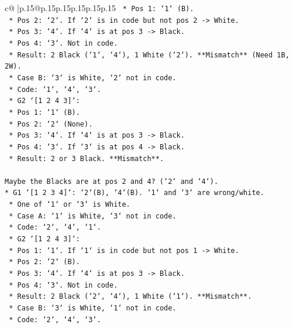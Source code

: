 \documentclass{article}
\begin{document}
{\begin{supertabular}{c@{$\;$}|p{.15\linewidth}@{}p{.15\linewidth}p{.15\linewidth}p{.15\linewidth}p{.15\linewidth}p{.15\linewidth}}
{{{\texttt{            *   Pos 1: `1` (B).} \\
\texttt{            *   Pos 2: `2`. If `2` is in code but not pos 2 {-}> White.} \\
\texttt{            *   Pos 3: `4`. If `4` is at pos 3 {-}> Black.} \\
\texttt{            *   Pos 4: `3`. Not in code.} \\
\texttt{            *   Result: 2 Black (`1`, `4`), 1 White (`2`). **Mismatch** (Need 1B, 2W).} \\
\texttt{    *   Case B: `3` is White, `2` not in code.} \\
\texttt{        *   Code: `1`, `4`, `3`.} \\
\texttt{        *   G2 `{[}1 2 4 3{]}`:} \\
\texttt{            *   Pos 1: `1` (B).} \\
\texttt{            *   Pos 2: `2` (None).} \\
\texttt{            *   Pos 3: `4`. If `4` is at pos 3 {-}> Black.} \\
\texttt{            *   Pos 4: `3`. If `3` is at pos 4 {-}> Black.} \\
\texttt{            *   Result: 2 or 3 Black. **Mismatch**.} \\
\\ 
\texttt{Maybe the Blacks are at pos 2 and 4? (`2` and `4`).} \\
\texttt{*   G1 `{[}1 2 3 4{]}`: `2`(B), `4`(B). `1` and `3` are wrong/white.} \\
\texttt{    *   One of `1` or `3` is White.} \\
\texttt{    *   Case A: `1` is White, `3` not in code.} \\
\texttt{        *   Code: `2`, `4`, `1`.} \\
\texttt{        *   G2 `{[}1 2 4 3{]}`:} \\
\texttt{            *   Pos 1: `1`. If `1` is in code but not pos 1 {-}> White.} \\
\texttt{            *   Pos 2: `2` (B).} \\
\texttt{            *   Pos 3: `4`. If `4` is at pos 3 {-}> Black.} \\
\texttt{            *   Pos 4: `3`. Not in code.} \\
\texttt{            *   Result: 2 Black (`2`, `4`), 1 White (`1`). **Mismatch**.} \\
\texttt{    *   Case B: `3` is White, `1` not in code.} \\
\texttt{        *   Code: `2`, `4`, `3`.} \\
}}}
\end{supertabular}}
\end{document}
